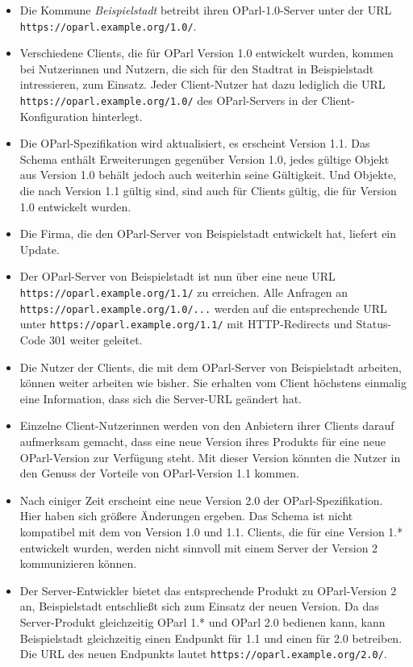 \documentclass[,a4paper]{article}
\begin{document}
\begin{itemize}
\item
  Die Kommune \emph{Beispielstadt} betreibt ihren OParl-1.0-Server unter
  der URL \texttt{https://oparl.example.org/1.0/}.
\item
  Verschiedene Clients, die für OParl Version 1.0 entwickelt wurden,
  kommen bei Nutzerinnen und Nutzern, die sich für den Stadtrat in
  Beispielstadt intressieren, zum Einsatz. Jeder Client-Nutzer hat dazu
  lediglich die URL \texttt{https://oparl.example.org/1.0/} des
  OParl-Servers in der Client-Konfiguration hinterlegt.
\item
  Die OParl-Spezifikation wird aktualisiert, es erscheint Version 1.1.
  Das Schema enthält Erweiterungen gegenüber Version 1.0, jedes gültige
  Objekt aus Version 1.0 behält jedoch auch weiterhin seine Gültigkeit.
  Und Objekte, die nach Version 1.1 gültig sind, sind auch für Clients
  gültig, die für Version 1.0 entwickelt wurden.
\item
  Die Firma, die den OParl-Server von Beispielstadt entwickelt hat,
  liefert ein Update.
\item
  Der OParl-Server von Beispielstadt ist nun über eine neue URL
  \texttt{https://oparl.example.org/1.1/} zu erreichen. Alle Anfragen an
  \texttt{https://oparl.example.org/1.0/...} werden auf die
  entsprechende URL unter \texttt{https://oparl.example.org/1.1/} mit
  HTTP-Redirects und Status-Code 301 weiter geleitet.
\item
  Die Nutzer der Clients, die mit dem OParl-Server von Beispielstadt
  arbeiten, können weiter arbeiten wie bisher. Sie erhalten vom Client
  höchstens einmalig eine Information, dass sich die Server-URL geändert
  hat.
\item
  Einzelne Client-Nutzerinnen werden von den Anbietern ihrer Clients
  darauf aufmerksam gemacht, dass eine neue Version ihres Produkts für
  eine neue OParl-Version zur Verfügung steht. Mit dieser Version
  könnten die Nutzer in den Genuss der Vorteile von OParl-Version 1.1
  kommen.
\item
  Nach einiger Zeit erscheint eine neue Version 2.0 der
  OParl-Spezifikation. Hier haben sich größere Änderungen ergeben. Das
  Schema ist nicht kompatibel mit dem von Version 1.0 und 1.1. Clients,
  die für eine Version 1.* entwickelt wurden, werden nicht sinnvoll mit
  einem Server der Version 2 kommunizieren können.
\item
  Der Server-Entwickler bietet das entsprechende Produkt zu
  OParl-Version 2 an, Beispielstadt entschließt sich zum Einsatz der
  neuen Version. Da das Server-Produkt gleichzeitig OParl 1.* und OParl
  2.0 bedienen kann, kann Beispielstadt gleichzeitig einen Endpunkt für
  1.1 und einen für 2.0 betreiben. Die URL des neuen Endpunkts lautet
  \texttt{https://oparl.example.org/2.0/}.
\end{itemize}
\end{document}
